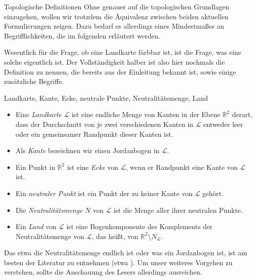 \begin{section}{Topologische Definitionen}
 Ohne genauer auf die topologischen Grundlagen einzugehen, wollen wir trotzdem die Äquivalenz zwischen beiden aktuellen Formulierungen zeigen. Dazu bedarf es allerdings eines Mindestmaßes an Begrifflichkeiten, die im folgenden erläutert werden.
 
 Wesentlich für die Frage, ob eine Landkarte färbbar ist, ist die Frage, was eine solche eigentlich ist. Der Vollständigkeit halber ist also hier nochmals die Definition zu nennen, die bereits aus der Einleitung bekannt ist, sowie einige zusätzliche Begriffe.
 
 \begin{definition}{Landkarte, Kante, Ecke, neutrale Punkte, Neutralitätsmenge, Land}
  \-\ 
  \begin{itemize}
    \item Eine \textit{Landkarte $\mathcal{L}$} ist eine endliche Menge von Kanten in der Ebene $\mathbb{R}^2$ derart, dass der Durchschnitt von je zwei verschiedenen Kanten in $\mathcal{L}$ entweder leer oder ein gemeinsamer Randpunkt dieser Kanten ist. 
    \item Als \textit{Kante} bezeichnen wir einen Jordanbogen in $\mathcal{L}$.
    \item Ein Punkt in $\mathbb{R}^2$ ist eine \textit{Ecke} von $\mathcal{L}$, wenn er Randpunkt eine Kante von $\mathcal{L}$ ist. 
    \item Ein \textit{neutraler Punkt} ist ein Punkt der zu keiner Kante von $\mathcal{L}$ gehört.
    \item Die \textit{Neutralitätsmenge $N$} von $\mathcal{L}$ ist die Menge aller ihrer neutralen Punkte. 
    \item Ein \textit{Land} von $\mathcal{L}$ ist eine Bogenkomponente des Komplements der Neutralitätsmenge von $\mathcal{L}$, das heißt, von $\mathbb{R}^2 \setminus N_{\mathcal{L}}$.
  \end{itemize}
 \end{definition}
 
 Das etwa die Neutralitätsmenge endlich ist oder was ein Jordanbogen ist, ist am besten der Literatur zu entnehmen (etwa \cite[Kapitel 2]{fritsch}). Um unser weiteres Vorgehen zu verstehen, sollte die Anschauung des Lesers allerdings ausreichen.
 

\end{section}
